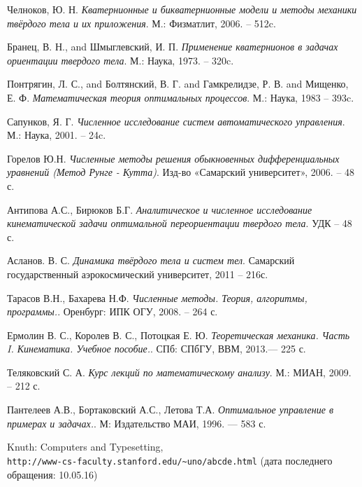 \documentclass[14pt]{extreport}
\begin{document}
\begin{thebibliography}{9}
Челноков, Ю. Н.
\textit{Кватернионные и бикватернионные модели и методы механики твёрдого тела и их приложения}. 
М.: Физматлит, 2006. – 512c.
 
Бранец, В. Н., and Шмыглевский, И. П.
\textit{Применение кватернионов в задачах ориентации твердого тела}. 
М.: Наука, 1973. – 320c.

Понтрягин, Л. С., and Болтянский, В. Г. and Гамкрелидзе, Р. В. and  Мищенко, Е. Ф.
\textit{Математическая теория оптимальных процессов}. 
М.: Наука, 1983 – 393c.

Сапунков, Я. Г.
\textit{Численное исследование систем автоматического управления}. 
М.: Наука, 2001. – 24c.	
	
Горелов Ю.Н.
\textit{Численные методы решения обыкновенных дифференциальных уравнений (Метод Рунге - Кутта)}. 
Изд-во «Самарский университет», 2006. – 48 с.		

Антипова А.С., Бирюков Б.Г.
\textit{Аналитическое и численное исследование  кинематической задачи оптимальной переориентации твердого тела}. 
УДК – 48 с.	

Асланов. В. С.
\textit{Динамика твёрдого тела и систем тел}. 
Самарский государственный аэрокосмический университет, 2011  – 216с.

Тарасов В.Н., Бахарева Н.Ф. 
\textit{Численные методы. Теория, алгоритмы, программы.}. 
Оренбург: ИПК ОГУ, 2008. – 264 с. 

Ермолин В. С., Королев В. С., Потоцкая Е. Ю.
\textit{Теоретическая механика. Часть I. Кинематика. Учебное пособие.}. 
СПб: СПбГУ, ВВМ, 2013.— 225 с. 

Теляковский С. А.
\textit{Курс лекций по математическому анализу}. 
М.: МИАН, 2009. – 212 с.

Пантелеев А.В., Бортаковский А.С., Летова Т.А.
\textit{Оптимальное управление в примерах и задачах.}. 
М: Издательство МАИ, 1996. — 583 с. 

Knuth: Computers and Typesetting,
\\\texttt{\small{http://www-cs-faculty.stanford.edu/\~{}uno/abcde.html}}
(дата последнего обращения: 10.05.16)


\end{thebibliography}
\end{document}
